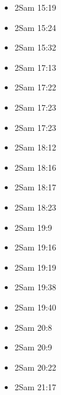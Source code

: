 \documentclass[14pt]{book}
\begin{document}
\begin{multicols}{2}
\begin{itemize}
							\item 2Sam 15:19
							
							\item 2Sam 15:24
							
							\item 2Sam 15:32
							
							\item 2Sam 17:13
							
							\item 2Sam 17:22
							
							\item 2Sam 17:23
							
							\item 2Sam 17:23
							
							\item 2Sam 18:12
							
							\item 2Sam 18:16
							
							\item 2Sam 18:17
							
							\item 2Sam 18:23
							
							\item 2Sam 19:9
							
							\item 2Sam 19:16
							
							\item 2Sam 19:19
							
							\item 2Sam 19:38
							
							\item 2Sam 19:40
							
							\item 2Sam 20:8
							
							\item 2Sam 20:9
							
							\item 2Sam 20:22
							
							\item 2Sam 21:17
							

\end{itemize}
\end{multicols}
\end{document}
